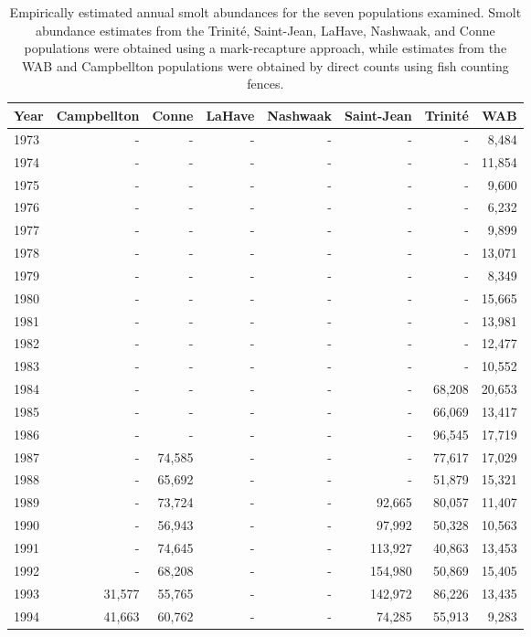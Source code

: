 \begingroup\footnotesize
\begin{longtable}{lrrrrrrr}
\caption{Empirically estimated annual smolt abundances for the seven populations examined. Smolt abundance estimates from the Trinité, Saint-Jean, LaHave, Nashwaak, and Conne populations were obtained using a mark-recapture approach, while estimates from the WAB and Campbellton populations were obtained by direct counts using fish counting fences.} \\ 
  \hline
Year & Campbellton & Conne & LaHave & Nashwaak & Saint-Jean & Trinité & WAB \\ 
  \hline
1973 & - & - & - & - & - & - & 8,484 \\ 
  1974 & - & - & - & - & - & - & 11,854 \\ 
  1975 & - & - & - & - & - & - & 9,600 \\ 
  1976 & - & - & - & - & - & - & 6,232 \\ 
  1977 & - & - & - & - & - & - & 9,899 \\ 
  1978 & - & - & - & - & - & - & 13,071 \\ 
  1979 & - & - & - & - & - & - & 8,349 \\ 
  1980 & - & - & - & - & - & - & 15,665 \\ 
  1981 & - & - & - & - & - & - & 13,981 \\ 
  1982 & - & - & - & - & - & - & 12,477 \\ 
  1983 & - & - & - & - & - & - & 10,552 \\ 
  1984 & - & - & - & - & - & 68,208 & 20,653 \\ 
  1985 & - & - & - & - & - & 66,069 & 13,417 \\ 
  1986 & - & - & - & - & - & 96,545 & 17,719 \\ 
  1987 & - & 74,585 & - & - & - & 77,617 & 17,029 \\ 
  1988 & - & 65,692 & - & - & - & 51,879 & 15,321 \\ 
  1989 & - & 73,724 & - & - & 92,665 & 80,057 & 11,407 \\ 
  1990 & - & 56,943 & - & - & 97,992 & 50,328 & 10,563 \\ 
  1991 & - & 74,645 & - & - & 113,927 & 40,863 & 13,453 \\ 
  1992 & - & 68,208 & - & - & 154,980 & 50,869 & 15,405 \\ 
  1993 & 31,577 & 55,765 & - & - & 142,972 & 86,226 & 13,435 \\ 
  1994 & 41,663 & 60,762 & - & - & 74,285 & 55,913 & 9,283 \\ 

\end{longtable}
